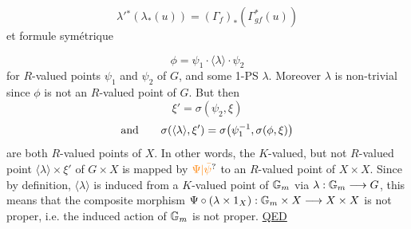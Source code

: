 



\[
\lambda'{}^*(\lambda_*(u))=(\Gamma_f)_*(\Gamma_{gf}^*(u))
\]
et formule symétrique



\[
\phi=\psi_1\cdot\langle\lambda\rangle\cdot\psi_2
\]
for $R$-valued points $\psi_1$ and $\psi_2$ of $G$, and some 1-PS $\lambda$. Moreover $\lambda$ is non-trivial since $\phi$ is not an $R$-valued point of $G$. But then
\[
\xi'=\sigma(\psi_2,\xi)
\]
\[
\text{and}\qquad \sigma(\langle\lambda\rangle,\xi')=\sigma\bigl(\psi_1^{-1},\sigma(\phi,\xi)\bigr)
\]
are both $R$-valued points of $X$.
In other words, the $K$-valued, but not $R$-valued point $\langle\lambda\rangle\times\xi'$ of $G\times X$ is mapped by $\unsure{\Psi|\bar{\psi}}$ to an $R$-valued point of $X\times X$. Since by definition, $\langle\lambda\rangle$ is induced from a $K$-valued point of $\mathbb G_m$ via $\lambda:\mathbb G_m\longrightarrow G$, this means that the composite morphism $\Psi\circ(\lambda\times1_X):\mathbb G_m\times X\longrightarrow X\times X$ is not proper, i.e. the induced action of $\mathbb G_m$ is not proper. \uline{QED}

